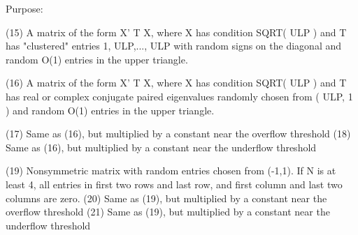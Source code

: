 \begin{DoxyParagraph}{Purpose\+: }
\begin{DoxyVerb}
    (15) A matrix of the form  X' T X, where X has condition
         SQRT( ULP ) and T has "clustered" entries 1, ULP,..., ULP
         with random signs on the diagonal and random O(1) entries
         in the upper triangle.

    (16) A matrix of the form  X' T X, where X has condition
         SQRT( ULP ) and T has real or complex conjugate paired
         eigenvalues randomly chosen from ( ULP, 1 ) and random
         O(1) entries in the upper triangle.

    (17) Same as (16), but multiplied by a constant
         near the overflow threshold
    (18) Same as (16), but multiplied by a constant
         near the underflow threshold

    (19) Nonsymmetric matrix with random entries chosen from (-1,1).
         If N is at least 4, all entries in first two rows and last
         row, and first column and last two columns are zero.
    (20) Same as (19), but multiplied by a constant
         near the overflow threshold
    (21) Same as (19), but multiplied by a constant
         near the underflow threshold\end{DoxyVerb}
 
\end{DoxyParagraph}

